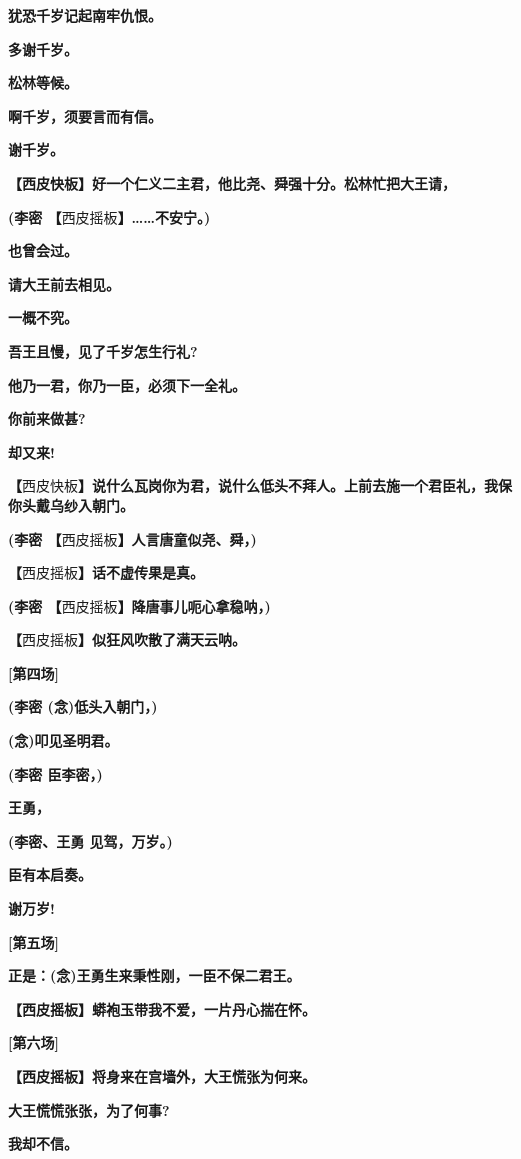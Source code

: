 \textbf{犹恐千岁记起南牢仇恨。}

\textbf{多谢千岁。}

\textbf{松林等候。}

\textbf{啊千岁，须要言而有信。}

\textbf{谢千岁。}

\textbf{【西皮快板】好一个仁义二主君，他比尧、舜强十分。松林忙把大王请，}

\textbf{(李密 【}西皮摇板\textbf{】\ldots{}\ldots{}不安宁。)}

\textbf{也曾会过。}

\textbf{请大王前去相见。}

\textbf{一概不究。}

\textbf{吾王且慢，见了千岁怎生行礼?}

\textbf{他乃一君，你乃一臣，必须下一全礼。}

\textbf{你前来做甚?}

\textbf{却又来!}

\textbf{【}西皮快板\textbf{】说什么瓦岗你为君，说什么低头不拜人。上前去施一个君臣礼，我保你头戴乌纱入朝门。}

\textbf{(李密 【}西皮摇板\textbf{】人言唐童似尧、舜，)}

\textbf{【}西皮摇板\textbf{】话不虚传果是真。}

\textbf{(李密 【}西皮摇板\textbf{】降唐事儿呃心拿稳呐，)}

\textbf{【}西皮摇板\textbf{】似狂风吹散了满天云呐。}

\textbf{{[}第四场{]}}

\textbf{(李密 (念)低头入朝门，)}

\textbf{(念)叩见圣明君。}

\textbf{(李密 臣李密，)}

\textbf{王勇，}

\textbf{(李密、王勇 见驾，万岁。)}

\textbf{臣有本启奏。}

\textbf{谢万岁!}

\textbf{{[}第五场{]}}

\textbf{正是：(念)王勇生来秉性刚，一臣不保二君王。}

\textbf{【西皮摇板】蟒袍玉带我不爱，一片丹心揣在怀。}

\textbf{{[}第六场{]}}

\textbf{【西皮摇板】将身来在宫墙外，大王慌张为何来。}

\textbf{大王慌慌张张，为了何事?}

\textbf{我却不信。}

